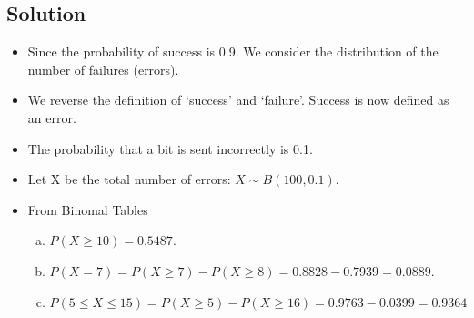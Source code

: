 \documentclass[a4paper,12pt]{article}
\begin{document}
\subsection*{Solution}
\begin{itemize}
\item  Since the probability of success is 0.9. We consider the distribution
of the number of failures (errors).
\item  We reverse the definition of `success' and `failure'. Success is now defined as an error.
\item  The probability that a bit is sent incorrectly is 0.1.
\item  Let X be the total number of errors: $X \sim B(100, 0.1)$.
\item  From Binomal Tables
\begin{enumerate}[(a)]
    \item 
$P(X \geq 10) = 0.5487$.
\item  $P(X = 7)=P(X \geq 7) - P(X \geq 8) =0.8828 - 0.7939 = 0.0889$.
\item  $P(5 \leq X  \leq 15) = P(X \geq 5) - P(X \geq 16) =0.9763 - 0.0399 = 0.9364$
\end{enumerate}
\end{itemize}
\end{document}
